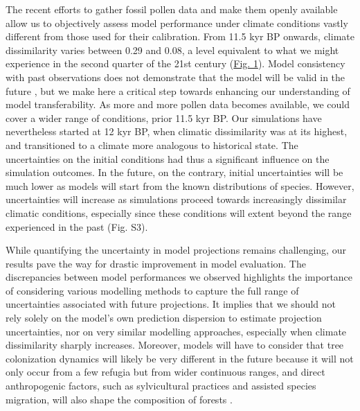 \documentclass[9pt,twocolumn,twoside]{pnas-new}
\begin{document}
The recent efforts to gather fossil pollen data and make them openly available \cite{Williams2018} allow us to objectively assess model performance under climate conditions vastly different from those used for their calibration. From 11.5 kyr BP onwards, climate dissimilarity varies between 0.29 and 0.08, a level equivalent to what we might experience in the second quarter of the 21st century (\hyperref[fig:climaticdissimilarity]{Fig. 1}). Model consistency with past observations does not demonstrate that the model will be valid in the future \cite{Oreskes1994}, but we make here a critical step towards enhancing our understanding of model transferability. As more and more pollen data becomes available, we could cover a wider range of conditions, prior 11.5 kyr BP.
Our simulations have nevertheless started at 12 kyr BP, when climatic dissimilarity was at its highest, and transitioned to a climate more analogous to historical state. The uncertainties on the initial conditions had thus a significant influence on the simulation outcomes. In the future, on the contrary, initial uncertainties will be much lower as models will start from the known distributions of species. However, uncertainties will increase as simulations proceed towards increasingly dissimilar climatic conditions, especially since these conditions  will extent beyond the range experienced in the past (Fig. S3).

While quantifying the uncertainty in model projections remains challenging, our results pave the way for drastic improvement in model evaluation. The discrepancies between model performances we observed highlights the importance of considering various modelling methods to capture the full range of uncertainties associated with future projections. It implies that we should not rely solely on the model's own prediction dispersion to estimate projection uncertainties, nor on very similar modelling approaches, especially when climate dissimilarity sharply increases. Moreover, models will have to consider that tree colonization dynamics will likely be very different in the future because it will not only occur from a few refugia but from wider continuous ranges, and direct anthropogenic factors, such as sylvicultural practices and assisted species migration, will also shape the composition of forests \cite{Aitken2016}.
\end{document}
